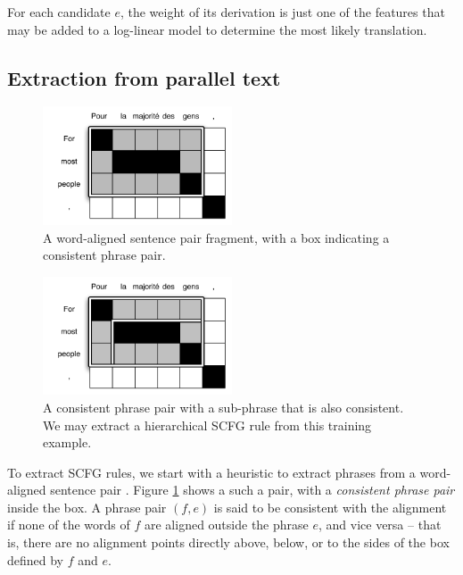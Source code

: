 \documentclass{article}
\begin{document}
For each candidate $e$, the weight of its derivation is just one of the features that may be added to a log-linear model to determine the most likely translation.

\subsection{Extraction from parallel text}

\begin{figure}[t]
\includegraphics[width=0.5\textwidth]{../wmt11/figures/simple-rule}
\caption{A word-aligned sentence pair fragment, with a box indicating a consistent phrase pair.\label{fig:aligned-sentence}}
\end{figure}

\begin{figure}[t]
\includegraphics[width=0.5\textwidth]{../wmt11/figures/hierarchical-rule}
\caption{A consistent phrase pair with a sub-phrase that is also consistent. We may extract a hierarchical SCFG rule from this training example.\label{fig:hierarchical-phrases}}
\end{figure}

To extract SCFG rules, we start with a heuristic to extract phrases from a word-aligned sentence pair \cite{tillmann-2003}. Figure \ref{fig:aligned-sentence} shows a such a pair, with a {\em consistent phrase pair} inside the box. A phrase pair $(f,e)$ is said to be consistent with the alignment if none of the words of $f$ are aligned outside the phrase $e$, and vice versa -- that is, there are no alignment points directly above, below, or to the sides of the box defined by $f$ and $e$.
\end{document}
